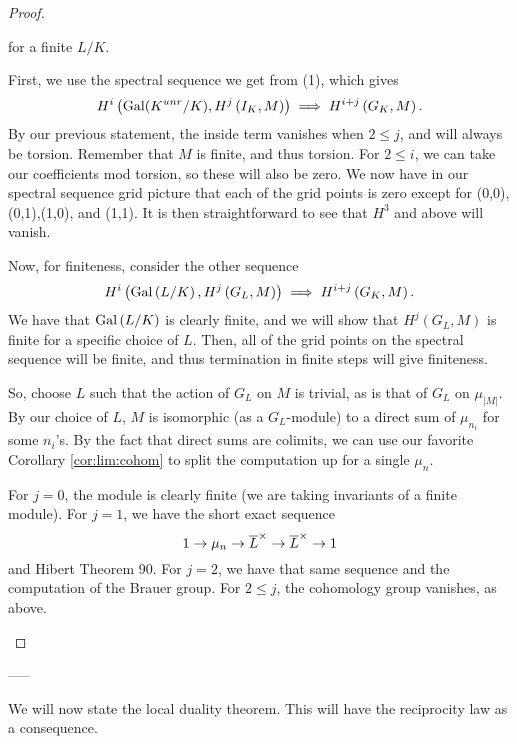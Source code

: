 \begin{proof}
\begin{enumerate}[(1)]
\begin{enumerate}[(1)]
					for a finite \(L / K\).
			\end{enumerate}
					
			First, we use the spectral sequence we get from (1), which
			gives 
			\[
				H^{i}\left( \operatorname{Gal}(K^{unr} / K), 
				H^{j}\left( I_{K}, M \right)\right) 
				\implies H^{i + j}\left( G_{K},M \right)
			.\] 
			By our previous statement, the inside term vanishes when
			\(2 \leq j\), and will always be torsion.
			Remember that \(M\) is finite, and thus torsion.
			For \(2 \leq i\), we can take our coefficients mod torsion,
			so these will also be zero. %
			We now have in our spectral sequence grid picture that 
			each of the grid points is zero except for 
			(0,0),(0,1),(1,0), and (1,1).
			It is then straightforward to see that \(H^{3}\) and above
			will vanish.

			Now, for finiteness, consider the other sequence
			\[
				H^{i}\left( \operatorname{Gal}\left( L / K \right),
				H^{j}\left( G_{L},M \right)\right)
				\implies H^{i+j}\left( G_{K},M \right)
			.\] 
			We have that \(\operatorname{Gal}\left( L / K \right)\) is clearly finite,
			and we will show that \(H^{j}\left( G_{L},M \right)\) is
			finite for a specific choice of \(L\).
			Then, all of the grid points on the spectral sequence will
			be finite, and thus termination in finite steps will give 
			finiteness.

			So, choose \(L\) such that the action of \(G_{L}\) on \(M\) 
			is trivial, as is that of \(G_{L}\) on \(\mu_{\left| M \right|}\).
			By our choice of \(L\), \(M\) is isomorphic (as a
			\(G_{L}\)-module) to a direct sum of \(\mu_{n_{i}}\) for 
			some \(n_{i}\)'s.
			By the fact that direct sums are colimits, we can use
			our favorite Corollary \ref{cor:lim:cohom} to split
			the computation up for a single \(\mu_{n}\).

			For \(j=0\), the module is clearly finite (we are taking
			invariants of a finite module).
			For \(j=1\), we have the short exact sequence
			\[
			1 \to \mu_{n} \to \overline{L}^{\times} \to 
			\overline{L}^{\times} \to 1
			\] 
			and Hibert Theorem 90.
			For \(j = 2\), we have that same sequence and the 
			computation of the Brauer group.
			For \(2 \leq j\), the cohomology group vanishes, 
			as above.

	\end{enumerate}
\end{proof}

-----

We will now state the local duality theorem. 
This will have the reciprocity law as a consequence.


